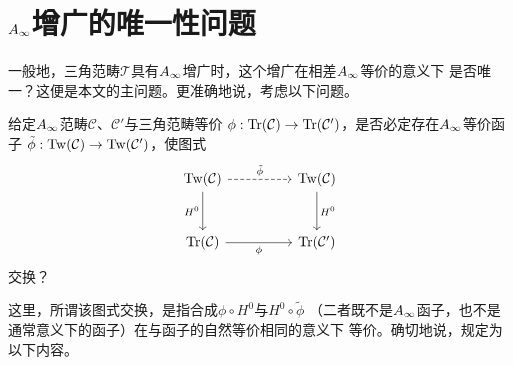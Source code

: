 
\section{\texorpdfstring{$A_{\infty}$}{A∞}增广的唯一性问题}
\label{sec:c03-4}

一般地，三角范畴$\mathcal{T}$具有$A_{\infty}$增广时，这个增广在相差$A_{\infty}$等价的意义下
是否唯一？这便是本文的主问题。更准确地说，考虑以下问题。

\begin{problem}\label{prob:c03-4.1}
给定$A_{\infty}$范畴$\mathcal{C}$、$\mathcal{C}'$与三角范畴等价
$\phi:\operatorname{Tr}(\mathcal{C})\to\operatorname{Tr}(\mathcal{C}')$，是否必定存在$A_{\infty}$等价函子
$\tilde{\phi}:\operatorname{Tw}(\mathcal{C})\to\operatorname{Tw}(\mathcal{C}')$，使图式
\begin{equation}
\begin{tikzcd}[column sep=4.6em, row sep=2.8em]
  \Tw(\mathcal{C}) \arrow[r, dashed, "{\tilde{\phi}}"] \arrow[d, "H^{0}"'] &
  \Tw(\mathcal{C}) \arrow[d, "H^{0}"] \\
  \Tr(\mathcal{C}) \arrow[r, "\phi"'] & \Tr(\mathcal{C}')
\end{tikzcd}
\label{eq:c03-7}
\end{equation}
交换？
\end{problem}


这里，所谓该图式交换，是指合成$\phi\circ H^{0}$与$H^{0}\circ\tilde{\phi}$
（二者既不是$A_{\infty}$函子，也不是通常意义下的函子）在与函子的自然等价相同的意义下
等价。确切地说，规定为以下内容。

